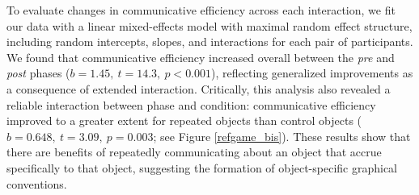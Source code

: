 \documentclass[10pt,letterpaper]{article}
\begin{document}

To evaluate changes in communicative efficiency across each interaction, we fit our data with a linear mixed-effects model with maximal random effect structure, including random intercepts, slopes, and interactions for each pair of participants. 
We found that communicative efficiency increased overall between the \textit{pre} and \textit{post} phases ($b = 1.45,~t = 14.3,~p <0.001$), reflecting generalized improvements as a consequence of extended interaction.
Critically, this analysis also revealed a reliable interaction between phase and condition: communicative efficiency improved to a greater extent for repeated objects than control objects ($b = 0.648, ~t = 3.09,~p = 0.003$; see Figure \ref{refgame_bis}). 
These results show that there are benefits of repeatedly communicating about an object that accrue specifically to that object, suggesting the formation of object-specific graphical conventions. 
 





\end{document}
